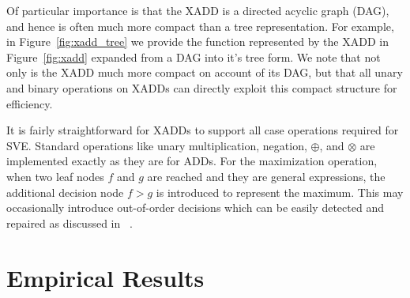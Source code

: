 \documentclass[letterpaper]{article}
\begin{document}
Of particular importance is that the XADD is a directed acyclic graph
(DAG), and hence is often much more compact than a tree
representation.  For example, in Figure~\ref{fig:xadd_tree} we provide
the function represented by the XADD in Figure~\ref{fig:xadd} 
expanded from a DAG into it's tree form.  We note that not only is
the XADD much more compact on account of its DAG, but that all
unary and binary operations on XADDs can directly exploit this
compact structure for efficiency.

It is fairly straightforward for XADDs to support all case operations
required for SVE.  Standard operations like unary multiplication,
negation, $\oplus$, and $\otimes$ are implemented exactly as they
are for ADDs.  For the maximization operation, when two leaf
nodes $f$ and $g$ are reached and they are general expressions,
the additional decision node $f > g$ is introduced to represent
the maximum.  This may occasionally introduce out-of-order decisions
which can be easily detected and repaired as discussed in~\cite{uai11} .

\vspace{-3mm}

\section{Empirical Results}

\vspace{-1mm}
\end{document}
